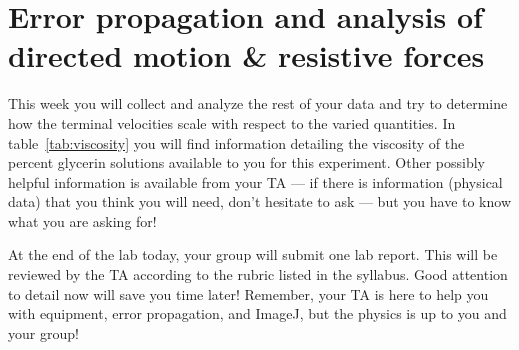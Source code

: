 \section{Error propagation and analysis of directed motion \& resistive forces}
This week you will collect and analyze the rest of your data and try to determine how the terminal velocities scale with respect to the varied quantities.
In table~\ref{tab:viscosity} you will find information detailing the viscosity of the percent glycerin solutions available to you for this experiment.
Other possibly helpful information is available from your TA — if there is information (physical data) that you think you will need, don't hesitate to ask — but you have to know what you are asking for! \par
At the end of the lab today, your group will submit one lab report.
This will be reviewed by the TA according to the rubric listed in the syllabus.
Good attention to detail now will save you time later!
Remember, your TA is here to help you with equipment, error propagation, and ImageJ, but the physics is up to you and your group!

